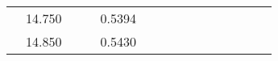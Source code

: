 \documentclass[a4paper,12pt]{article}
\begin{document}
\begin{table}[htp]
\begin{tabular}{|c|c|c|c|c|c|c|c|c|c|c|c|c|c|c|}
                       & 14.750                  &                                       &                        & 0.5394 &                        &                        &                         &                             &                                                            &                                                               &                        &                        &                         &                               \\ \cline{2-2} \cline{5-5}
                       & 14.850                  &                                       &                        & 0.5430 &                        &                        &                         &                             &                                                            &                                                               &                        &                        &                         &                               \\ \hline
\end{tabular}
\end{table}
\recalctypearea
\end{document}

